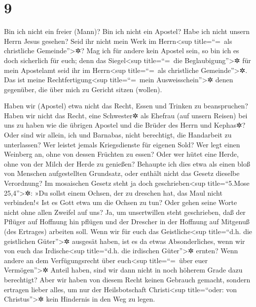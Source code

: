 \hypertarget{section-8}{%
\section{9}\label{section-8}}

 Bin ich nicht ein freier (Mann)? Bin ich nicht ein
Apostel? Habe ich nicht unsern Herrn Jesus gesehen? Seid ihr nicht mein
Werk im Herrn\textless sup title=``=~als christliche
Gemeinde''\textgreater✲?  Mag ich für andere kein Apostel
sein, so bin ich es doch sicherlich für euch; denn das
Siegel\textless sup title=``=~die Beglaubigung''\textgreater✲ für mein
Apostelamt seid ihr im Herrn\textless sup title=``=~als christliche
Gemeinde''\textgreater✲.  Das ist meine
Rechtfertigung\textless sup title=``=~mein Ausweisschein''\textgreater✲
denen gegenüber, die über mich zu Gericht sitzen (wollen).

 Haben wir (Apostel) etwa nicht das Recht, Essen und
Trinken zu beanspruchen?  Haben wir nicht das Recht, eine
Schwester✲ als Ehefrau (auf unsern Reisen) bei uns zu haben wie die
übrigen Apostel und die Brüder des Herrn und Kephas✲? 
Oder sind wir allein, ich und Barnabas, nicht berechtigt, die Handarbeit
zu unterlassen?  Wer leistet jemals Kriegsdienste für
eigenen Sold? Wer legt einen Weinberg an, ohne von dessen Früchten zu
essen? Oder wer hütet eine Herde, ohne von der Milch der Herde zu
genießen?  Behaupte ich dies etwa als einen bloß von
Menschen aufgestellten Grundsatz, oder enthält nicht das Gesetz dieselbe
Verordnung?  Im mosaischen Gesetz steht ja doch
geschrieben\textless sup title=``5.Mose 25,4''\textgreater✲: »Du sollst
einem Ochsen, der zu dreschen hat, das Maul nicht verbinden!« Ist es
Gott etwa um die Ochsen zu tun?  Oder gehen seine Worte
nicht ohne allen Zweifel auf uns? Ja, um unsertwillen steht geschrieben,
daß der Pflüger auf Hoffnung hin pflügen und der Drescher in der
Hoffnung auf Mitgenuß (des Ertrages) arbeiten soll.  Wenn
wir für euch das Geistliche\textless sup title=``d.h. die geistlichen
Güter''\textgreater✲ ausgesät haben, ist es da etwas Absonderliches,
wenn wir von euch das Irdische\textless sup title=``d.h. die irdischen
Güter''\textgreater✲ ernten?  Wenn andere an dem
Verfügungsrecht über euch\textless sup title=``=~über euer
Vermögen''\textgreater✲ Anteil haben, sind wir dann nicht in noch
höherem Grade dazu berechtigt? Aber wir haben von diesem Recht keinen
Gebrauch gemacht, sondern ertragen lieber alles, um nur der
Heilsbotschaft Christi\textless sup title=``oder: von
Christus''\textgreater✲ kein Hindernis in den Weg zu legen.

